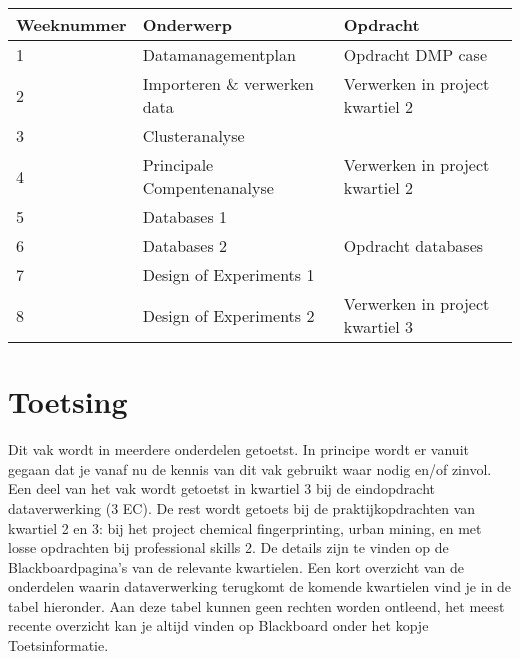 \begin{table}[h]
\begin{tabular}{|l|l|l|}
\hline
\rowcolor{saxion}
Weeknummer & Onderwerp                    & Opdracht                         \\ \hline
1          & Datamanagementplan           & Opdracht DMP case                                  \\ \hline
2          & Importeren \& verwerken data & Verwerken in project kwartiel 2           \\ \hline
\rowcolor[HTML]{C0C0C0} 
3          & Clusteranalyse               &                                  \\ \hline
\rowcolor[HTML]{C0C0C0} 
4          & Principale Compentenanalyse  & Verwerken in project kwartiel 2 \\ \hline
5          & Databases 1                  &                                  \\ \hline
6          & Databases 2                  & Opdracht databases               \\ \hline
\rowcolor[HTML]{C0C0C0} 
7          & Design of Experiments 1      &                                  \\ \hline
\rowcolor[HTML]{C0C0C0} 
8          & Design of Experiments 2      & Verwerken in project kwartiel 3 \\ \hline
\end{tabular}
\end{table}


\section{Toetsing}

Dit vak wordt in meerdere onderdelen getoetst. In principe wordt er vanuit gegaan dat je vanaf nu de kennis van dit vak gebruikt waar nodig en/of zinvol. Een deel van het vak wordt getoetst in kwartiel 3 bij de eindopdracht dataverwerking (3 EC). De rest wordt getoets bij de praktijkopdrachten van kwartiel 2 en 3: bij het project chemical fingerprinting, urban mining, en met losse opdrachten bij professional skills 2. De details zijn te vinden op de Blackboardpagina's van de relevante kwartielen. Een kort overzicht van de onderdelen waarin dataverwerking terugkomt de komende kwartielen vind je in de tabel hieronder. Aan deze tabel kunnen geen rechten worden ontleend, het meest recente overzicht kan je altijd vinden op Blackboard onder het kopje Toetsinformatie.

